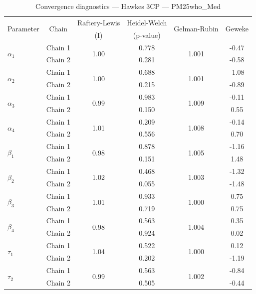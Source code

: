 \begin{table}[H]
\centering
\caption{Convergence diagnostics — Hawkes 3CP — PM25who_Med}
\begin{tabular}{lccccc}
\toprule
\multirow{2}{*}{Parameter} & \multirow{2}{*}{Chain} & Raftery-Lewis & Heidel-Welch & \multirow{2}{*}{Gelman-Rubin} & \multirow{2}{*}{Geweke} \\
 & & (I) & (p-value) & & (z) \\
\midrule
\multirow{2}{*}{$\alpha_1$} & Chain 1 & \multirow{2}{*}{1.00} & 0.778 & \multirow{2}{*}{1.001} & -0.47 \\
 & Chain 2 & & 0.281 & & -0.58 \\
\multirow{2}{*}{$\alpha_2$} & Chain 1 & \multirow{2}{*}{1.00} & 0.688 & \multirow{2}{*}{1.001} & -1.08 \\
 & Chain 2 & & 0.215 & & -0.89 \\
\multirow{2}{*}{$\alpha_3$} & Chain 1 & \multirow{2}{*}{0.99} & 0.983 & \multirow{2}{*}{1.009} & -0.11 \\
 & Chain 2 & & 0.150 & & 0.55 \\
\multirow{2}{*}{$\alpha_4$} & Chain 1 & \multirow{2}{*}{1.01} & 0.209 & \multirow{2}{*}{1.008} & -0.14 \\
 & Chain 2 & & 0.556 & & 0.70 \\
\midrule
\multirow{2}{*}{$\beta_1$} & Chain 1 & \multirow{2}{*}{0.98} & 0.878 & \multirow{2}{*}{1.005} & -1.16 \\
 & Chain 2 & & 0.151 & & 1.48 \\
\multirow{2}{*}{$\beta_2$} & Chain 1 & \multirow{2}{*}{1.02} & 0.468 & \multirow{2}{*}{1.003} & -1.32 \\
 & Chain 2 & & 0.055 & & -1.48 \\
\multirow{2}{*}{$\beta_3$} & Chain 1 & \multirow{2}{*}{1.01} & 0.933 & \multirow{2}{*}{1.000} & 0.75 \\
 & Chain 2 & & 0.719 & & 0.75 \\
\multirow{2}{*}{$\beta_4$} & Chain 1 & \multirow{2}{*}{0.98} & 0.563 & \multirow{2}{*}{1.004} & 0.35 \\
 & Chain 2 & & 0.924 & & 0.02 \\
\midrule
\multirow{2}{*}{$\tau_1$} & Chain 1 & \multirow{2}{*}{1.04} & 0.522 & \multirow{2}{*}{1.000} & 0.12 \\
 & Chain 2 & & 0.202 & & -1.19 \\
\multirow{2}{*}{$\tau_2$} & Chain 1 & \multirow{2}{*}{0.99} & 0.563 & \multirow{2}{*}{1.002} & -0.84 \\
 & Chain 2 & & 0.505 & & -0.44 \\

\end{tabular}
\end{table}
